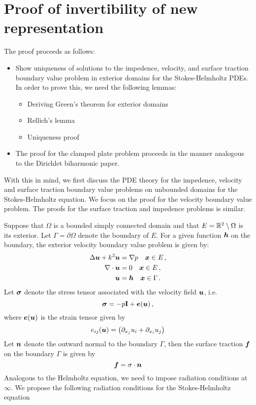 \section{Proof of invertibility of new representation}
The proof proceeds as follows:
\begin{itemize}
\item Show uniqueness of solutions to the impedence, velocity, and surface
traction boundary value problem in exterior domains for the Stokes-Helmholtz
PDEs. In order to prove this, we need the following lemmas:
\begin{itemize}
\item Deriving Green's theorem for exterior domains
\item Rellich's lemma
\item Uniqueness proof
\end{itemize}
\item The proof for the clamped plate problem proceeds in the manner
analogous to the Dirichlet biharmonic paper.
\end{itemize}

With this in mind, we first discuss the PDE theory for the impedence, 
velocity and surface traction boundary value problems on unbounded
domains for the Stokes-Helmholtz equation.
We focus on the proof for the velocity boundary value problem. 
The proofs for the surface traction and impedence problems is similar.

Suppose that $\Omega$ is a bounded simply connected domain and that
$E = \mathbb{R}^{2} \setminus \Omega$ is its exterior.
Let $\Gamma = \partial \Omega$ denote the boundary of $E$.
For a given function ${\boldsymbol h}$ on the boundary, 
the exterior velocity boundary value problem is given by:
\begin{align}
\Delta {\boldsymbol u} + k^{2} {\boldsymbol u} &= \nabla p \quad {\boldsymbol x} \in E \, ,\\
\nabla \cdot {\boldsymbol u} &= 0 \quad {\boldsymbol x} \in E \, ,\\
{\boldsymbol u} &= {\boldsymbol h} \quad {\boldsymbol x} \in \Gamma \, . \\
\end{align}
Let ${\boldsymbol \sigma}$ denote the stress tensor associated with the velocity
field ${\boldsymbol u}$, i.e.
\begin{equation}
{\boldsymbol \sigma} = -p {\bf I} + {\boldsymbol e}({\boldsymbol u}) \, ,
\end{equation}
where ${\boldsymbol e}({\boldsymbol u})$ is the strain tensor given by
\begin{equation}
e_{ij}({\boldsymbol u}) = \left( \partial_{x_j} u_i + \partial_{x_i} u_j \right)
\end{equation}
Let ${\boldsymbol n}$ denote the outward normal to the boundary $\Gamma$, then
the surface traction ${\boldsymbol f}$ on the boundary $\Gamma$ is given 
by
\begin{equation}
{\boldsymbol f} = \sigma \cdot {\boldsymbol n}
\end{equation}
Analogous to the Helmholtz equation, we need to impose radiation conditions
at $\infty$.
We propose the following radiation conditions for the Stokes-Helmholtz 
equation


